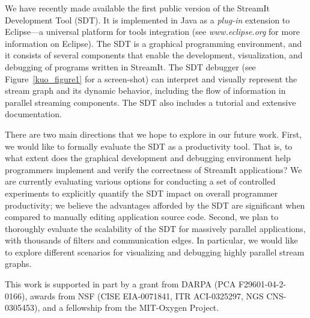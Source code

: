 \documentclass{csailabstractbook}
\begin{document}

We  have recently  made  available  the first  public  version of  the
StreamIt Development Tool (SDT).  It  is implemented in Java as a {\it
plug-in}  extension  to   Eclipse---a  universal  platform  for  tools
integration  (see {\it www.eclipse.org}  for more  information on Eclipse).
The SDT  is a  graphical programming environment,  and it  consists of
several  components that  enable the  development,  visualization, and
debugging  of programs  written in  StreamIt.  The  SDT  debugger (see
Figure~\ref{kuo_figure1} for a  screen-shot) can interpret and visually
represent  the stream graph  and its  dynamic behavior,  including the
flow of  information in parallel  streaming components.  The  SDT also
includes a tutorial and extensive documentation.


There are  two main directions that  we hope to explore  in our future
work.  First,  we  would  like  to  formally evaluate  the  SDT  as  a
productivity  tool.   That  is,  to  what extent  does  the  graphical
development and  debugging environment help  programmers implement and
verify  the correctness  of StreamIt  applications?  We  are currently
evaluating  various  options  for   conducting  a  set  of  controlled
experiments  to   explicitly  quantify  the  SDT   impact  on  overall
programmer productivity; we believe the advantages afforded by the SDT
are significant when compared to manually editing application source code.
Second, we plan to thoroughly  evaluate the scalability of the SDT for
massively  parallel  applications,   with  thousands  of  filters  and
communication  edges.   In  particular,   we  would  like  to  explore
different  scenarios  for visualizing  and  debugging highly  parallel
stream graphs.


This work is supported in part by a grant from DARPA (PCA
F29601-04-2-0166), awards from NSF (CISE EIA-0071841, ITR ACI-0325297,
NGS CNS-0305453), and a fellowship from the MIT-Oxygen Project.


\end{document}
